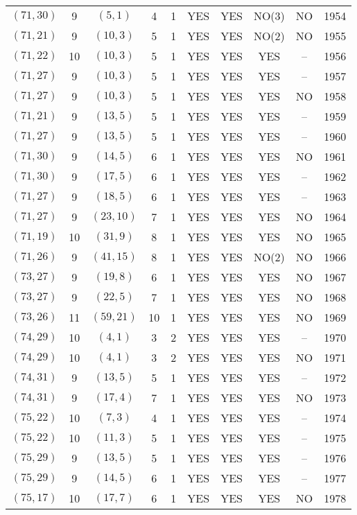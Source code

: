 \begin{longtable}{|c|c|c|c|c|c|c|c|c|c|}
$(71, 30)$ & 9 & $(5, 1)$ & 4 & 1 & YES & YES & NO(3) & NO & 1954\\
$(71, 21)$ & 9 & $(10, 3)$ & 5 & 1 & YES & YES & NO(2) & NO & 1955\\
$(71, 22)$ & 10 & $(10, 3)$ & 5 & 1 & YES & YES & YES & -- & 1956\\
$(71, 27)$ & 9 & $(10, 3)$ & 5 & 1 & YES & YES & YES & -- & 1957\\
$(71, 27)$ & 9 & $(10, 3)$ & 5 & 1 & YES & YES & YES & NO & 1958\\
$(71, 21)$ & 9 & $(13, 5)$ & 5 & 1 & YES & YES & YES & -- & 1959\\
$(71, 27)$ & 9 & $(13, 5)$ & 5 & 1 & YES & YES & YES & -- & 1960\\
$(71, 30)$ & 9 & $(14, 5)$ & 6 & 1 & YES & YES & YES & NO & 1961\\
$(71, 30)$ & 9 & $(17, 5)$ & 6 & 1 & YES & YES & YES & -- & 1962\\
$(71, 27)$ & 9 & $(18, 5)$ & 6 & 1 & YES & YES & YES & -- & 1963\\
$(71, 27)$ & 9 & $(23, 10)$ & 7 & 1 & YES & YES & YES & NO & 1964\\
$(71, 19)$ & 10 & $(31, 9)$ & 8 & 1 & YES & YES & YES & NO & 1965\\
$(71, 26)$ & 9 & $(41, 15)$ & 8 & 1 & YES & YES & NO(2) & NO & 1966\\
$(73, 27)$ & 9 & $(19, 8)$ & 6 & 1 & YES & YES & YES & NO & 1967\\
$(73, 27)$ & 9 & $(22, 5)$ & 7 & 1 & YES & YES & YES & NO & 1968\\
$(73, 26)$ & 11 & $(59, 21)$ & 10 & 1 & YES & YES & YES & NO & 1969\\
$(74, 29)$ & 10 & $(4, 1)$ & 3 & 2 & YES & YES & YES & -- & 1970\\
$(74, 29)$ & 10 & $(4, 1)$ & 3 & 2 & YES & YES & YES & NO & 1971\\
$(74, 31)$ & 9 & $(13, 5)$ & 5 & 1 & YES & YES & YES & -- & 1972\\
$(74, 31)$ & 9 & $(17, 4)$ & 7 & 1 & YES & YES & YES & NO & 1973\\
$(75, 22)$ & 10 & $(7, 3)$ & 4 & 1 & YES & YES & YES & -- & 1974\\
$(75, 22)$ & 10 & $(11, 3)$ & 5 & 1 & YES & YES & YES & -- & 1975\\
$(75, 29)$ & 9 & $(13, 5)$ & 5 & 1 & YES & YES & YES & -- & 1976\\
$(75, 29)$ & 9 & $(14, 5)$ & 6 & 1 & YES & YES & YES & -- & 1977\\
$(75, 17)$ & 10 & $(17, 7)$ & 6 & 1 & YES & YES & YES & NO & 1978\\

\end{longtable}
